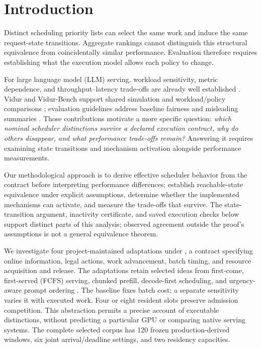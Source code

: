 \section{Introduction}
Distinct scheduling priority lists can select the same work and induce the
same request-state transitions. Aggregate rankings cannot distinguish this
structural equivalence from coincidentally similar performance. Evaluation
therefore requires establishing what the execution model allows each policy
to change.

For large language model (LLM) serving, workload sensitivity, metric dependence,
and throughput--latency trade-offs
are already well established \citep{papaioannou2024workload,agrawal2024etalon,agrawal2024sarathi}.
Vidur and Vidur-Bench support shared simulation and workload/policy comparisons
\citep{vidur2024}; evaluation guidelines address baseline fairness and
misleading summaries \citep{agrawal2025evaluation}. Those contributions
motivate a more specific question: \emph{which nominal scheduler distinctions
survive a declared execution contract, why do others disappear, and what
performance trade-offs remain?} Answering it requires examining state
transitions and mechanism activation alongside performance measurements.

Our methodological approach is to derive effective scheduler behavior from
the contract before interpreting performance differences: establish
reachable-state equivalence under explicit assumptions, determine whether
the implemented mechanisms can activate, and measure the trade-offs that
survive. The state-transition argument, inactivity certificate, and saved
execution checks below support distinct parts of this analysis; observed
agreement outside the proof's assumptions is not a general equivalence
theorem.

We investigate four project-maintained adaptations under \cm, a contract
specifying online information, legal actions, work advancement, batch timing,
and resource acquisition and release. The adaptations retain selected ideas
from first-come, first-served (FCFS) serving, chunked prefill, decode-first scheduling, and urgency-aware
prompt ordering \citep{kwon2023vllm,agrawal2024sarathi,slai2025}.
The baseline fixes batch cost; a separate sensitivity varies it with executed
work. Four or eight
resident slots preserve admission competition. This abstraction permits a
precise account of executable distinctions, without predicting a particular
GPU or comparing native serving systems. The complete selected corpus has
120 frozen production-derived windows, six joint arrival/deadline settings,
and two residency capacities.

